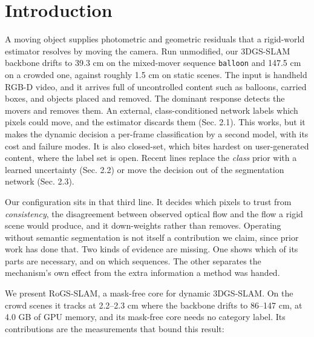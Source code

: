 
\section{Introduction}


A moving object supplies photometric and geometric residuals that a rigid-world estimator resolves by moving the camera. Run unmodified, our 3DGS-SLAM backbone drifts to 39.3 cm on the mixed-mover sequence \texttt{balloon} and 147.5 cm on a crowded one, against roughly 1.5 cm on static scenes. The input is handheld RGB-D video, and it arrives full of uncontrolled content such as balloons, carried boxes, and objects placed and removed. The dominant response detects the movers and removes them. An external, class-conditioned network labels which pixels could move, and the estimator discards them (Sec. 2.1). This works, but it makes the dynamic decision a per-frame classification by a second model, with its cost and failure modes. It is also closed-set, which bites hardest on user-generated content, where the label set is open. Recent lines replace the \emph{class} prior with a learned uncertainty (Sec. 2.2) or move the decision out of the segmentation network (Sec. 2.3).


Our configuration sits in that third line. It decides which pixels to trust from \emph{consistency}, the disagreement between observed optical flow and the flow a rigid scene would produce, and it down-weights rather than removes. Operating without semantic segmentation is not itself a contribution we claim, since prior work has done that. Two kinds of evidence are missing. One shows which of its parts are necessary, and on which sequences. The other separates the mechanism's own effect from the extra information a method was handed.


We present RoGS-SLAM, a mask-free core for dynamic 3DGS-SLAM. On the crowd scenes it tracks at 2.2--2.3 cm where the backbone drifts to 86--147 cm, at 4.0 GB of GPU memory, and its mask-free core needs no category label. Its contributions are the measurements that bound this result:


